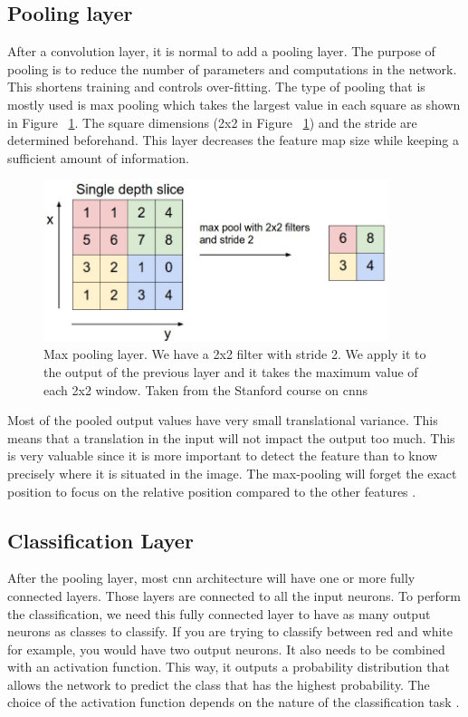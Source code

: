 \subsection{Pooling layer}
After a convolution layer, it is normal to add a pooling layer. The purpose of pooling is to reduce the number of parameters and computations in the network. This shortens training and controls over-fitting.
The type of pooling that is mostly used is max pooling which takes the largest value in each square as shown in Figure ~\ref{fig:maxpool}. The square dimensions (2x2 in Figure ~\ref{fig:maxpool})  and the stride are determined beforehand. This layer decreases the feature map size while keeping a sufficient amount of information. 
	\begin{figure}[!htp]
    \centering
        \includegraphics[width=0.9\textwidth]{figures/02-maxpool}
        \caption[Max Pooling layer]{Max pooling layer. We have a 2x2 filter with stride 2. We apply it to the output of the previous layer and it takes the maximum value of each 2x2 window. Taken from the Stanford course on \gls{cnn}s \cite{cs231n}}\label{fig:maxpool}
    \end{figure}
 
   
Most of the pooled output values have very small translational variance. This means that a translation in the input will not impact the output too much. This is very valuable since it is more important to detect the feature than to know precisely where it is situated in the image. The max-pooling will forget the exact position to focus on the relative position compared to the other features \cite{cs231n}.

\subsection{Classification Layer}
\label{sec:class_lay}
After the pooling layer, most \gls{cnn} architecture will have one or more fully connected layers. Those layers are connected to all the input neurons. To perform the classification, we need this fully connected layer to have as many output neurons as classes to classify. If you are trying to classify between red and white for example, you would have two output neurons.  It also needs to be combined with an activation function. This way, it outputs a probability distribution that allows the network to predict the class that has the highest probability. The choice of the activation function depends on the nature of the classification task \cite{deepbook}.
